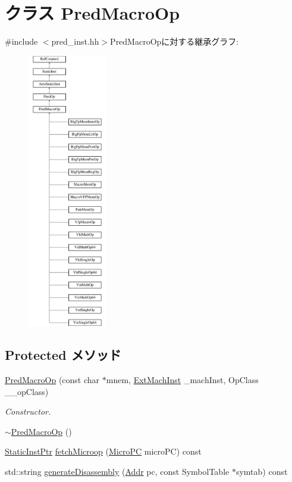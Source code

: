 \hypertarget{classArmISA_1_1PredMacroOp}{
\section{クラス PredMacroOp}
\label{classArmISA_1_1PredMacroOp}
}


{\ttfamily \#include $<$pred\_\-inst.hh$>$}PredMacroOpに対する継承グラフ:\begin{figure}[H]
\begin{center}
\leavevmode
\includegraphics[height=12cm]{classArmISA_1_1PredMacroOp}
\end{center}
\end{figure}
\subsection*{Protected メソッド}
\begin{DoxyCompactItemize}
\item 
\hyperlink{classArmISA_1_1PredMacroOp_a4d1de434734e67db31db5b479940c0cc}{PredMacroOp} (const char $\ast$mnem, \hyperlink{classStaticInst_a5605d4fc727eae9e595325c90c0ec108}{ExtMachInst} \_\-machInst, OpClass \_\-\_\-opClass)
\begin{DoxyCompactList}\small\item\em Constructor. \item\end{DoxyCompactList}\item 
\hyperlink{classArmISA_1_1PredMacroOp_a33c257e43bb7ea10d1fc01b071da214c}{$\sim$PredMacroOp} ()
\item 
\hyperlink{classRefCountingPtr}{StaticInstPtr} \hyperlink{classArmISA_1_1PredMacroOp_ae9e7acd6304ee397f1ab470e283ae76b}{fetchMicroop} (\hyperlink{base_2types_8hh_adfb4d8b20c5abc8be73dd367b16f2d57}{MicroPC} microPC) const 
\item 
std::string \hyperlink{classArmISA_1_1PredMacroOp_a95d323a22a5f07e14d6b4c9385a91896}{generateDisassembly} (\hyperlink{classm5_1_1params_1_1Addr}{Addr} pc, const SymbolTable $\ast$symtab) const 
\end{DoxyCompactItemize}
